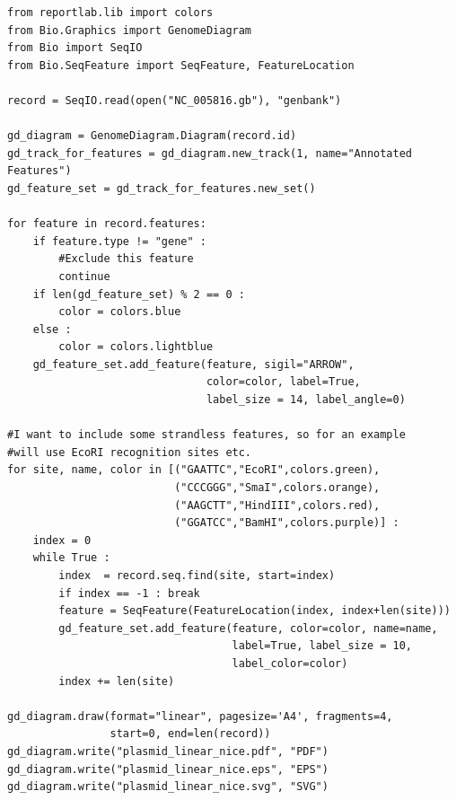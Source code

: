 \documentclass{report}
\begin{document}
\begin{verbatim}
from reportlab.lib import colors
from Bio.Graphics import GenomeDiagram
from Bio import SeqIO
from Bio.SeqFeature import SeqFeature, FeatureLocation

record = SeqIO.read(open("NC_005816.gb"), "genbank")

gd_diagram = GenomeDiagram.Diagram(record.id)
gd_track_for_features = gd_diagram.new_track(1, name="Annotated Features")
gd_feature_set = gd_track_for_features.new_set()

for feature in record.features:
    if feature.type != "gene" :
        #Exclude this feature
        continue
    if len(gd_feature_set) % 2 == 0 :
        color = colors.blue
    else :
        color = colors.lightblue
    gd_feature_set.add_feature(feature, sigil="ARROW",
                               color=color, label=True,
                               label_size = 14, label_angle=0)

#I want to include some strandless features, so for an example
#will use EcoRI recognition sites etc.
for site, name, color in [("GAATTC","EcoRI",colors.green),
                          ("CCCGGG","SmaI",colors.orange),
                          ("AAGCTT","HindIII",colors.red),
                          ("GGATCC","BamHI",colors.purple)] :
    index = 0
    while True :
        index  = record.seq.find(site, start=index)
        if index == -1 : break
        feature = SeqFeature(FeatureLocation(index, index+len(site)))
        gd_feature_set.add_feature(feature, color=color, name=name,
                                   label=True, label_size = 10,
                                   label_color=color)
        index += len(site)

gd_diagram.draw(format="linear", pagesize='A4', fragments=4,
                start=0, end=len(record))
gd_diagram.write("plasmid_linear_nice.pdf", "PDF")
gd_diagram.write("plasmid_linear_nice.eps", "EPS")
gd_diagram.write("plasmid_linear_nice.svg", "SVG")
\end{verbatim}
\end{document}
